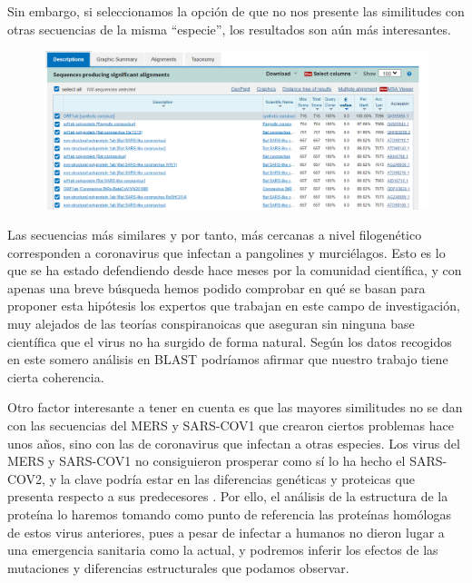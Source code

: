 \documentclass[12pt]{article}
\begin{document}
Sin embargo, si seleccionamos la opción de que no nos presente las similitudes con otras secuencias de la misma ``especie'', los resultados son aún más interesantes.

\begin{figure}[H]
\centering
\includegraphics[width=1.2\textwidth]{Screenshot_9}
\end{figure}

Las secuencias más similares y por tanto, más cercanas a nivel filogenético corresponden a coronavirus que infectan a pangolines y murciélagos. Esto es lo que se ha estado defendiendo desde hace meses por la comunidad científica, y con apenas una breve búsqueda hemos podido comprobar en qué se basan para proponer esta hipótesis los expertos que trabajan en este campo de investigación, muy alejados de las teorías conspiranoicas que aseguran sin ninguna base científica que el virus no ha surgido de forma natural. Según los datos recogidos en este somero análisis en BLAST podríamos afirmar que nuestro trabajo tiene cierta coherencia.
\newline

Otro factor interesante a tener en cuenta es que las mayores similitudes no se dan con las secuencias del MERS y SARS-COV1 que crearon ciertos problemas hace unos años, sino con las de coronavirus que infectan a otras especies. Los virus del MERS y SARS-COV1 no consiguieron prosperar como sí lo ha hecho el SARS-COV2, y la clave podría estar en las diferencias genéticas y proteicas que presenta respecto a sus predecesores \cite{Kumar2020}. Por ello, el análisis de la estructura de la proteína lo haremos tomando como punto de referencia las proteínas homólogas de estos virus anteriores, pues a pesar de infectar a humanos no dieron lugar a una emergencia sanitaria como la actual, y podremos inferir los efectos de las mutaciones y diferencias estructurales que podamos observar.
\newline
\end{document}
